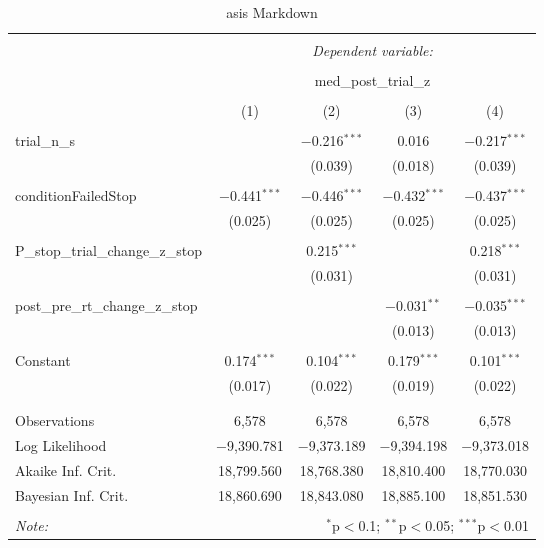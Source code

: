 \documentclass[
]{article}
\begin{document}
\begin{table}[!htbp] \centering 
  \caption{asis Markdown} 
  \label{} 
\begin{tabular}{@{\extracolsep{5pt}}lcccc} 
\\[-1.8ex]\hline 
\hline \\[-1.8ex] 
 & \multicolumn{4}{c}{\textit{Dependent variable:}} \\ 
\cline{2-5} 
\\[-1.8ex] & \multicolumn{4}{c}{med\_post\_trial\_z} \\ 
\\[-1.8ex] & (1) & (2) & (3) & (4)\\ 
\hline \\[-1.8ex] 
 trial\_n\_s &  & $-$0.216$^{***}$ & 0.016 & $-$0.217$^{***}$ \\ 
  &  & (0.039) & (0.018) & (0.039) \\ 
  & & & & \\ 
 conditionFailedStop & $-$0.441$^{***}$ & $-$0.446$^{***}$ & $-$0.432$^{***}$ & $-$0.437$^{***}$ \\ 
  & (0.025) & (0.025) & (0.025) & (0.025) \\ 
  & & & & \\ 
 P\_stop\_trial\_change\_z\_stop &  & 0.215$^{***}$ &  & 0.218$^{***}$ \\ 
  &  & (0.031) &  & (0.031) \\ 
  & & & & \\ 
 post\_pre\_rt\_change\_z\_stop &  &  & $-$0.031$^{**}$ & $-$0.035$^{***}$ \\ 
  &  &  & (0.013) & (0.013) \\ 
  & & & & \\ 
 Constant & 0.174$^{***}$ & 0.104$^{***}$ & 0.179$^{***}$ & 0.101$^{***}$ \\ 
  & (0.017) & (0.022) & (0.019) & (0.022) \\ 
  & & & & \\ 
\hline \\[-1.8ex] 
Observations & 6,578 & 6,578 & 6,578 & 6,578 \\ 
Log Likelihood & $-$9,390.781 & $-$9,373.189 & $-$9,394.198 & $-$9,373.018 \\ 
Akaike Inf. Crit. & 18,799.560 & 18,768.380 & 18,810.400 & 18,770.030 \\ 
Bayesian Inf. Crit. & 18,860.690 & 18,843.080 & 18,885.100 & 18,851.530 \\ 
\hline 
\hline \\[-1.8ex] 
\textit{Note:}  & \multicolumn{4}{r}{$^{*}$p$<$0.1; $^{**}$p$<$0.05; $^{***}$p$<$0.01} \\ 
\end{tabular} 
\end{table}
\end{document}
